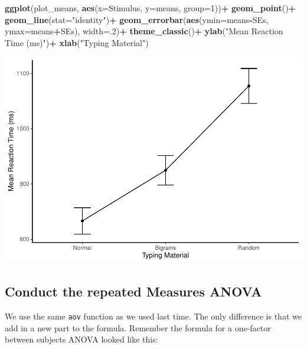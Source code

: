 \documentclass[
]{book}
\newenvironment{Shaded}{\begin{snugshade}}{\end{snugshade}}
\newcommand{\AttributeTok}[1]{\textcolor[rgb]{0.13,0.29,0.53}{#1}}
\newcommand{\DecValTok}[1]{\textcolor[rgb]{0.00,0.00,0.81}{#1}}
\newcommand{\FunctionTok}[1]{\textcolor[rgb]{0.13,0.29,0.53}{\textbf{#1}}}
\newcommand{\NormalTok}[1]{#1}
\newcommand{\SpecialCharTok}[1]{\textcolor[rgb]{0.81,0.36,0.00}{\textbf{#1}}}
\newcommand{\StringTok}[1]{\textcolor[rgb]{0.31,0.60,0.02}{#1}}
\begin{document}
\begin{Shaded}
\begin{Highlighting}[]
\FunctionTok{ggplot}\NormalTok{(plot\_means, }\FunctionTok{aes}\NormalTok{(}\AttributeTok{x=}\NormalTok{Stimulus, }\AttributeTok{y=}\NormalTok{means, }\AttributeTok{group=}\DecValTok{1}\NormalTok{))}\SpecialCharTok{+}
  \FunctionTok{geom\_point}\NormalTok{()}\SpecialCharTok{+}
  \FunctionTok{geom\_line}\NormalTok{(}\AttributeTok{stat=}\StringTok{"identity"}\NormalTok{)}\SpecialCharTok{+}
  \FunctionTok{geom\_errorbar}\NormalTok{(}\FunctionTok{aes}\NormalTok{(}\AttributeTok{ymin=}\NormalTok{means}\SpecialCharTok{{-}}\NormalTok{SEs, }\AttributeTok{ymax=}\NormalTok{means}\SpecialCharTok{+}\NormalTok{SEs), }\AttributeTok{width=}\NormalTok{.}\DecValTok{2}\NormalTok{)}\SpecialCharTok{+}
  \FunctionTok{theme\_classic}\NormalTok{()}\SpecialCharTok{+}
  \FunctionTok{ylab}\NormalTok{(}\StringTok{"Mean Reaction Time (ms)"}\NormalTok{)}\SpecialCharTok{+}
  \FunctionTok{xlab}\NormalTok{(}\StringTok{"Typing Material"}\NormalTok{)}
\end{Highlighting}
\end{Shaded}

\includegraphics{Statistics_Lab_files/figure-latex/unnamed-chunk-495-1.pdf}

\hypertarget{conduct-the-repeated-measures-anova}{%
\subsection{Conduct the repeated Measures ANOVA}\label{conduct-the-repeated-measures-anova}}

We use the same \texttt{aov} function as we used last time. The only difference is that we add in a new part to the formula. Remember the formula for a one-factor between subjects ANOVA looked like this:
\end{document}
